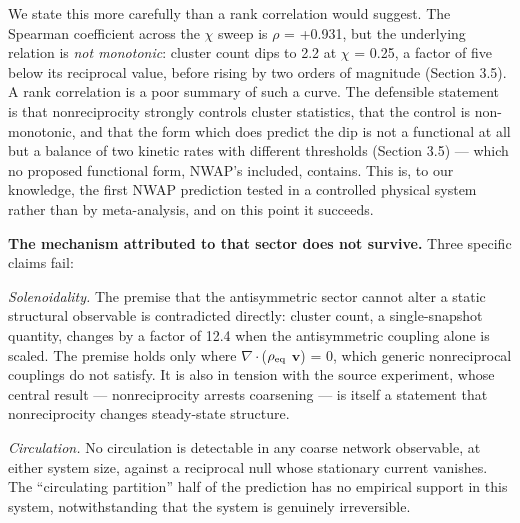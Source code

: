 \documentclass[aps,pre,preprint,superscriptaddress,nofootinbib,longbibliography]{revtex4-2}
\begin{document}
We state this more carefully than a rank correlation would suggest. The Spearman coefficient across the $\chi$ sweep is $\rho$ = +0.931, but the underlying relation is \emph{not monotonic}: cluster count dips to 2.2 at $\chi$ = 0.25, a factor of five below its reciprocal value, before rising by two orders of magnitude (Section 3.5). A rank correlation is a poor summary of such a curve. The defensible statement is that nonreciprocity strongly controls cluster statistics, that the control is non-monotonic, and that the form which does predict the dip is not a functional at all but a balance of two kinetic rates with different thresholds (Section 3.5) --- which no proposed functional form, NWAP's included, contains. This is, to our knowledge, the first NWAP prediction tested in a controlled physical system rather than by meta-analysis, and on this point it succeeds.

\textbf{The mechanism attributed to that sector does not survive.} Three specific claims fail:

\emph{Solenoidality.} The premise that the antisymmetric sector cannot alter a static structural observable is contradicted directly: cluster count, a single-snapshot quantity, changes by a factor of 12.4 when the antisymmetric coupling alone is scaled. The premise holds only where $\nabla \cdot$($\rho_{\rm eq}$ $\mathbf{v}$) = 0, which generic nonreciprocal couplings do not satisfy. It is also in tension with the source experiment, whose central result --- nonreciprocity arrests coarsening --- is itself a statement that nonreciprocity changes steady-state structure.

\emph{Circulation.} No circulation is detectable in any coarse network observable, at either system size, against a reciprocal null whose stationary current vanishes. The ``circulating partition'' half of the prediction has no empirical support in this system, notwithstanding that the system is genuinely irreversible.
\end{document}
